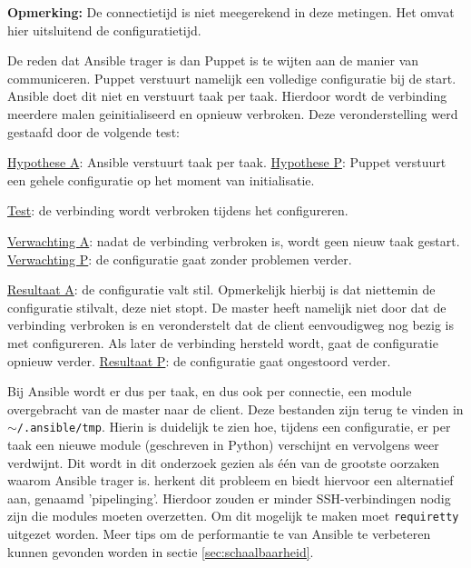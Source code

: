 \textbf{Opmerking:} De \gls{connectietijd} is niet meegerekend in deze metingen. Het omvat hier uitsluitend de \gls{configuratietijd}.

De reden dat Ansible trager is dan Puppet is te wijten aan de manier van communiceren. Puppet verstuurt namelijk een volledige configuratie bij de start. Ansible doet dit niet en verstuurt taak per taak. Hierdoor wordt de verbinding meerdere malen geinitialiseerd en opnieuw verbroken. Deze veronderstelling werd gestaafd door de volgende test:

\begin{addmargin}[2em]{0cm}
\underline{Hypothese A}: Ansible verstuurt taak per taak.\newline
\underline{Hypothese P}: Puppet verstuurt een gehele configuratie op het moment van initialisatie.

\underline{Test}: de verbinding wordt verbroken tijdens het configureren.

\underline{Verwachting A}: nadat de verbinding verbroken is, wordt geen nieuw taak gestart.\newline
\underline{Verwachting P}: de configuratie gaat zonder problemen verder.

\underline{Resultaat A}: de configuratie valt stil. Opmerkelijk hierbij is dat niettemin de configuratie stilvalt, deze niet stopt. De master heeft namelijk niet door dat de verbinding verbroken is en veronderstelt dat de client eenvoudigweg nog bezig is met configureren. Als later de verbinding hersteld wordt, gaat de configuratie opnieuw verder.\newline
\underline{Resultaat P}: de configuratie gaat ongestoord verder.
\end{addmargin}

Bij Ansible wordt er dus per taak, en dus ook per connectie, een module overgebracht van de master naar de client. Deze bestanden zijn terug te vinden in \texttt{$\sim$/.ansible/tmp}. Hierin is duidelijk te zien hoe, tijdens een configuratie, er per taak een nieuwe module (geschreven in Python) verschijnt en vervolgens weer verdwijnt. Dit wordt in dit onderzoek gezien als \'e\'en van de grootste oorzaken waarom Ansible trager is.  \textcite{AnsibleTuning} herkent dit probleem en biedt hiervoor een alternatief aan, genaamd 'pipelinging'. Hierdoor zouden er minder SSH-verbindingen nodig zijn die modules moeten overzetten. Om dit mogelijk te maken moet \texttt{requiretty} uitgezet worden. Meer tips om de performantie te van Ansible te verbeteren kunnen gevonden worden in sectie \ref{sec:schaalbaarheid}.

